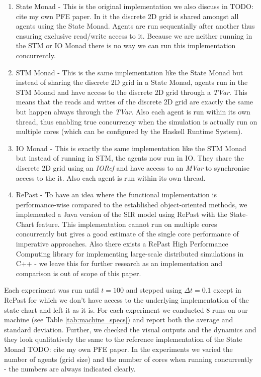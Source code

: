 \begin{enumerate}
	\item State Monad - This is the original implementation we also discuss in TODO: cite my own PFE paper. In it the discrete 2D grid is shared amongst all agents using the State Monad. Agents are run sequentially after another thus ensuring exclusive read/write access to it. Because we are neither running in the STM or IO Monad there is no way we can run this implementation concurrently.
	\item STM Monad - This is the same implementation like the State Monad but instead of sharing the discrete 2D grid in a State Monad, agents run in the STM Monad and have access to the discrete 2D grid through a \textit{TVar}. This means that the reads and writes of the discrete 2D grid are exactly the same but happen always through the \textit{TVar}. Also each agent is run within its own thread, thus enabling true concurrency when the simulation is actually run on multiple cores (which can be configured by the Haskell Runtime System).
	\item IO Monad - This is exactly the same implementation like the STM Monad but instead of running in STM, the agents now run in IO. They share the discrete 2D grid using an \textit{IORef} and have access to an \textit{MVar} to synchronise access to the it. Also each agent is run within its own thread.
	\item RePast - To have an idea where the functional implementation is performance-wise compared to the established object-oriented methods, we implemented a Java version of the SIR model using RePast with the State-Chart feature. This implementation cannot run on multiple cores concurrently but gives a good estimate of the single core performance of imperative approaches. Also there exists a RePast High Performance Computing library for implementing large-scale distributed simulations in C++ - we leave this for further research as an implementation and comparison is out of scope of this paper.
\end{enumerate}

Each experiment was run until $t = 100$ and stepped using $\Delta t = 0.1$ except in RePast for which we don't have access to the underlying implementation of the state-chart and left it as it is. For each experiment we conducted 8 runs on our machine (see Table \ref{tab:machine_specs}) and report both the average and standard deviation. Further, we checked the visual outputs and the dynamics and they look qualitatively the same to the reference implementation of the State Monad TODO: cite my own PFE paper. In the experiments we varied the number of agents (grid size) and the number of cores when running concurrently - the numbers are always indicated clearly.

